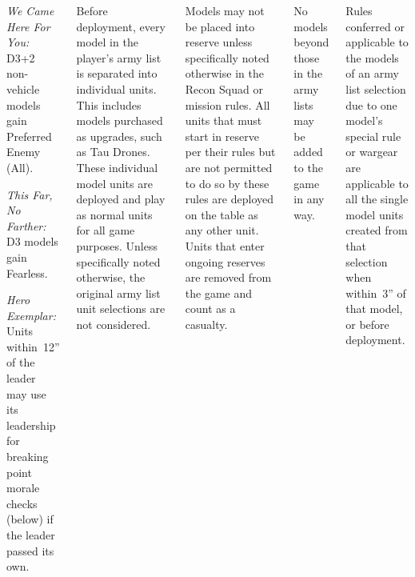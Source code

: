 \begin{columns}
\begin{squishitemize}


\item \emph{We Came Here For You:} D3+2 non-vehicle models gain
  Preferred Enemy (All).

\item \emph{This Far, No Farther:} D3 models gain Fearless.

\item \emph{Hero Exemplar:} Units within~12'' of the leader may use
  its leadership for breaking point morale checks (below) if the
  leader passed its own.
\end{squishitemize}


\pagebreak
{}%

\vspace{-9pt}%
  Before deployment, every model in
the player's army list is separated into individual units. This
includes models purchased as upgrades, such as Tau Drones. These
individual model units are deployed and play as normal units for all
game purposes. Unless specifically noted otherwise, the original army
list unit selections are not considered.

  Models may not be placed
into reserve unless specifically noted otherwise in the Recon Squad or
mission rules. All units that must start in reserve per their rules
but are not permitted to do so by these rules are deployed on the
table as any other unit. Units that enter ongoing reserves are removed
from the game and count as a casualty.

  No models beyond those in
the army lists may be added to the game in any way.

  Rules conferred or applicable
to the models of an army list selection due to one model's special
rule or wargear are applicable to all the single model units created
from that selection when within~3'' of that model, or before
deployment.



\end{columns}
